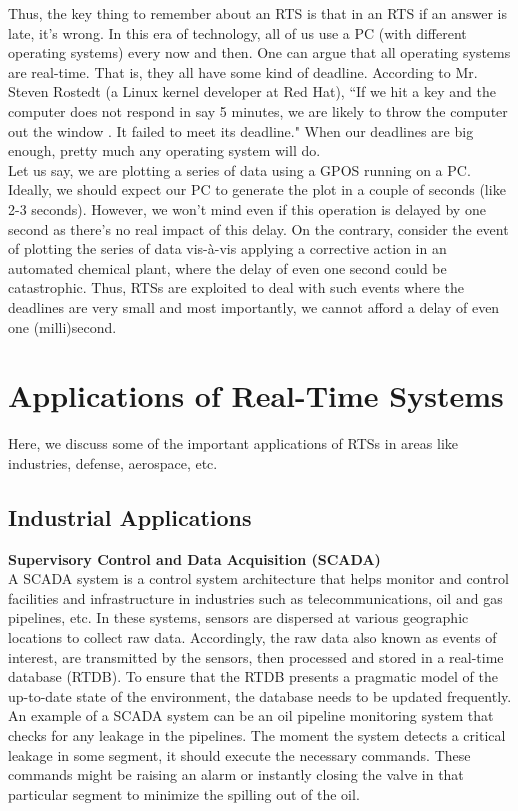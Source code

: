 \documentclass[12pt]{report}
\begin{document}
Thus, the key thing to remember about an RTS is that in an RTS if an answer is late, it's wrong. In this era of technology, all of us use a PC (with different operating systems) every now and then. One can argue that all operating systems are real-time. That is, they all have some kind of deadline. According to  Mr. Steven Rostedt (a Linux kernel developer at Red Hat), ``If we hit a key and the computer does not respond in say 5 minutes, we are likely to throw the computer out the window \cite{rtlinux}. It failed to meet its deadline." When our deadlines are big enough, pretty much any operating system will do. \\

Let us say, we are plotting a series of data using a GPOS running on a PC. Ideally, we should expect our PC to generate the plot in a couple of seconds (like 2-3 seconds). However, we won't mind even if this operation is delayed by one second as there's no real impact of this delay. On the contrary, consider the event of plotting the series of data vis-\`a-vis applying a corrective action in an automated chemical plant, where the delay of even one second could be catastrophic. Thus, RTSs are exploited to deal with such events where the deadlines are very small and most importantly, we cannot afford a delay of even one (milli)second.

\section{Applications of Real-Time Systems}
Here, we discuss some of the important applications of RTSs \cite{NPTEL} in areas like industries, defense, aerospace, etc. 

\subsection{Industrial Applications}
\noindent\textbf{Supervisory Control and Data Acquisition (SCADA)}\\
A SCADA system is a control system architecture that helps monitor and control facilities and infrastructure in industries such as telecommunications, oil and gas pipelines, etc. In these systems, sensors are dispersed at various geographic locations to collect raw data. Accordingly, the raw data also known as events of interest, are transmitted by the sensors, then processed and stored in a real-time database (RTDB). To ensure that the RTDB presents a pragmatic model of the up-to-date state of the environment, the database needs to be updated frequently. An example of a SCADA system can be an oil pipeline monitoring system that checks for any leakage in the pipelines. The moment the system detects a critical leakage in some segment, it should execute the necessary commands. These commands might be raising an alarm or instantly closing the valve in that particular segment to minimize the spilling out of the oil. 
\end{document}
